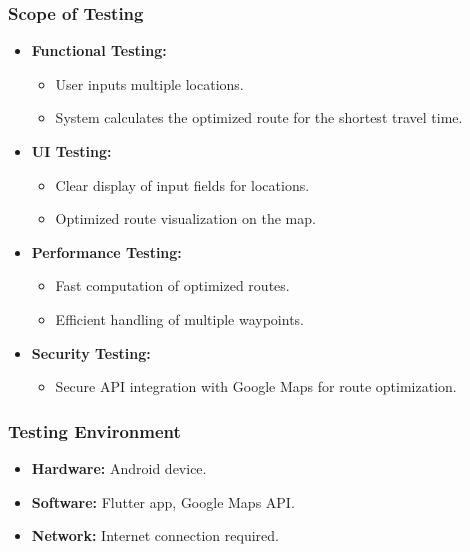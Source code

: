 \documentclass{article}
\begin{document}
\subsubsection{Scope of Testing}
\begin{itemize}
    \item \textbf{Functional Testing:}
    \begin{itemize}
        \item User inputs multiple locations.
        \item System calculates the optimized route for the shortest travel time.
    \end{itemize}
    \item \textbf{UI Testing:}
    \begin{itemize}
        \item Clear display of input fields for locations.
        \item Optimized route visualization on the map.
    \end{itemize}
    \item \textbf{Performance Testing:}
    \begin{itemize}
        \item Fast computation of optimized routes.
        \item Efficient handling of multiple waypoints.
    \end{itemize}
    \item \textbf{Security Testing:}
    \begin{itemize}
        \item Secure API integration with Google Maps for route optimization.
    \end{itemize}
\end{itemize}

\subsubsection{Testing Environment}
\begin{itemize}
    \item \textbf{Hardware:} Android device.
    \item \textbf{Software:} Flutter app, Google Maps API.
    \item \textbf{Network:} Internet connection required.
\end{itemize}
\end{document}
